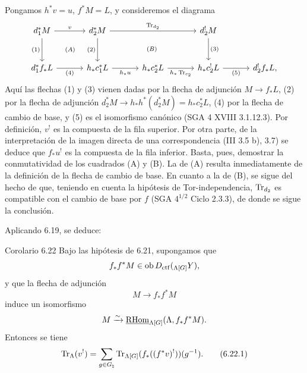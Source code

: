 Pongamos $h^*v=u$, $f^*M=L$, y consideremos el diagrama
\[
\begin{tikzcd}[column sep=3.2em,row sep=large]
d_1^*M \arrow[r,"v"] \arrow[d,"{(1)}"'] &
d_2^*M \arrow[rr,"\Tr_{d_2}"] \arrow[d,"{(2)}"'] &&
d_2^!M \arrow[d,"{(3)}"] & {}\\
d_1^*f_*L \arrow[r,"{(4)}"'] &
h_*c_1^*L \arrow[r,"h_*u"'] &
h_*c_2^*L \arrow[r,"h_*\Tr_{c_2}"'] &
h_*c_2^!L \arrow[r,"{(5)}"'] &
d_2^!f_*L,
\arrow[from=1-1,to=2-2, phantom, "\scriptstyle (A)"]
\arrow[from=1-2,to=2-4, phantom, "\scriptstyle (B)"]
\end{tikzcd}
\]
Aquí las flechas (1) y (3) vienen dadas por la flecha de adjunción $M\to f_*L$, (2) por la flecha de adjunción $d_2^*M\to h_*h^*(d_2^*M)=h_*c_2^*L$, (4) por la flecha de cambio de base, y (5) es el isomorfismo canónico (SGA 4 XVIII 3.1.12.3). Por definición, $v^!$ es la compuesta de la fila superior. Por otra parte, de la interpretación de la imagen directa de una correspondencia (III 3.5 b), 3.7) se deduce que $f_*u^!$ es la compuesta de la fila inferior. Basta, pues, demostrar la conmutatividad de los cuadrados (A) y (B). La de (A) resulta inmediatamente de la definición de la flecha de cambio de base. En cuanto a la de (B), se sigue del hecho de que, teniendo en cuenta la hipótesis de Tor-independencia, $\operatorname{Tr}_{d_2}$ es compatible con el cambio de base por $f$ (SGA $4^{1/2}$ Ciclo 2.3.3), de donde se sigue la conclusión.

Aplicando 6.19, se deduce:

\begin{statement}{Corolario 6.22}
Bajo las hipótesis de 6.21, supongamos que
\[
f_*f^*M\in\operatorname{ob} D_{\mathrm{ctf}}({}_{\Lambda[G]}Y),
\]
y que la flecha de adjunción
\[
M\to f_*f^*M
\]
induce un isomorfismo
\[
M\xrightarrow{\sim}\underline{\mathrm{RHom}}_{\Lambda[G]}(\Lambda,f_*f^*M).
\]
Entonces se tiene
\begin{equation}
\operatorname{Tr}_{\Lambda}(v^!)=
\sum_{g\in G_{\natural}}\operatorname{Tr}_{\Lambda[G]}(f_*((f^*v)^!))(g^{-1}).
\tag{6.22.1}
\end{equation}
\end{statement}
